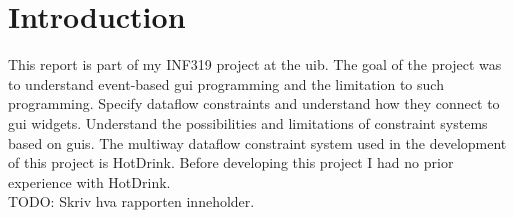 \chapter{Introduction}

This report is part of my INF319 project at the \gls{uib}. The goal of the project was to
understand event-based \gls{gui} programming and the limitation to such programming.
Specify dataflow constraints and understand how they connect to \gls{gui} widgets.
Understand the possibilities and limitations of constraint systems based on \gls{gui}s.
The multiway dataflow constraint system used in the development of this project is
HotDrink. Before developing this project I had no prior experience with HotDrink. 
\\TODO: Skriv hva rapporten inneholder.